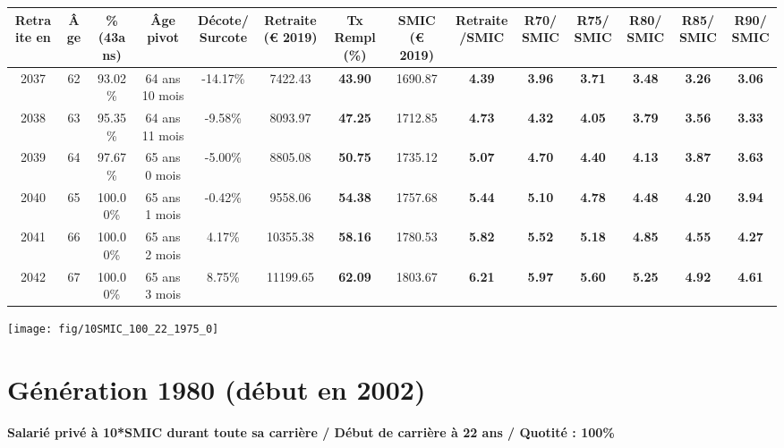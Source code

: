 \begin{adjustbox}{max width=\textwidth} 
\begin{tabular}[htb]{|c|c||c|c|c||c|c||c|c||c|c|c|c|c|} 
\hline 
 Retraite en &  Âge &  \%(43ans) &  Âge pivot &  Décote/Surcote &  Retraite (\euro{} 2019) &  Tx Rempl(\%) &  SMIC (\euro{} 2019) &  Retraite/SMIC &  R70/SMIC &  R75/SMIC &  R80/SMIC &  R85/SMIC &  R90/SMIC \\ 
\hline \hline 
 2037 &  62 &  93.02\% &  64 ans 10 mois &  -14.17\% &  7422.43 &  {\bf 43.90} &  1690.87 &  {\bf 4.39} &  {\bf 3.96} &  {\bf 3.71} &  {\bf 3.48} &  {\bf 3.26} &  {\bf 3.06} \\ 
\hline 
 2038 &  63 &  95.35\% &  64 ans 11 mois &  -9.58\% &  8093.97 &  {\bf 47.25} &  1712.85 &  {\bf 4.73} &  {\bf 4.32} &  {\bf 4.05} &  {\bf 3.79} &  {\bf 3.56} &  {\bf 3.33} \\ 
\hline 
 2039 &  64 &  97.67\% &  65 ans 0 mois &  -5.00\% &  8805.08 &  {\bf 50.75} &  1735.12 &  {\bf 5.07} &  {\bf 4.70} &  {\bf 4.40} &  {\bf 4.13} &  {\bf 3.87} &  {\bf 3.63} \\ 
\hline 
 2040 &  65 &  100.00\% &  65 ans 1 mois &  -0.42\% &  9558.06 &  {\bf 54.38} &  1757.68 &  {\bf 5.44} &  {\bf 5.10} &  {\bf 4.78} &  {\bf 4.48} &  {\bf 4.20} &  {\bf 3.94} \\ 
\hline 
 2041 &  66 &  100.00\% &  65 ans 2 mois &  4.17\% &  10355.38 &  {\bf 58.16} &  1780.53 &  {\bf 5.82} &  {\bf 5.52} &  {\bf 5.18} &  {\bf 4.85} &  {\bf 4.55} &  {\bf 4.27} \\ 
\hline 
 2042 &  67 &  100.00\% &  65 ans 3 mois &  8.75\% &  11199.65 &  {\bf 62.09} &  1803.67 &  {\bf 6.21} &  {\bf 5.97} &  {\bf 5.60} &  {\bf 5.25} &  {\bf 4.92} &  {\bf 4.61} \\ 
\hline 
\hline 
\end{tabular} 
\end{adjustbox} 
 
 \vspace{0.1cm} 

 {\hspace{-2.2cm}\texttt{[image: fig/10SMIC\_100\_22\_1975\_0]}} 

\newpage 
 
\section{Génération 1980 (début en 2002)\label{10SMIC_100_22_1980_0}} 
 
{\bf \noindent Salarié privé à 10*SMIC durant toute sa carrière / Début de carrière à 22 ans / Quotité : 100\%}  ~ 

